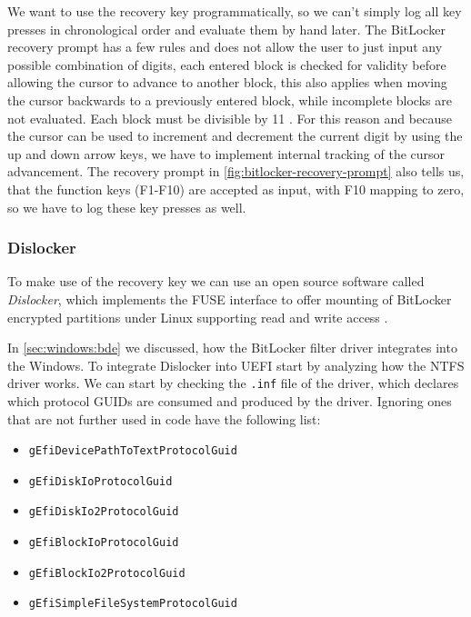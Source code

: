 

We want to use the recovery key programmatically, so we can't simply log all key presses in chronological order and evaluate them by hand later.
The BitLocker recovery prompt has a few rules and does not allow the user to just input any possible combination of digits, each entered block is checked for validity before allowing the cursor to advance to another block, this also applies when moving the cursor backwards to a previously entered block, while incomplete blocks are not evaluated.
Each block must be divisible by 11 \cite[9. BitLocker Key Recovery]{windows-internals-6-part2}.
For this reason and because the cursor can be used to increment and decrement the current digit by using the up and down arrow keys, we have to implement internal tracking of the cursor advancement.
The recovery prompt in \autoref{fig:bitlocker-recovery-prompt} also tells us, that the function keys (F1-F10) are accepted as input, with F10 mapping to zero, so we have to log these key presses as well.

\subsubsection{Dislocker}

To make use of the recovery key we can use an open source software called \emph{Dislocker}, which implements the \ac{FUSE} interface to offer mounting of BitLocker encrypted partitions under Linux supporting read and write access \cite{dislocker}.

In \autoref{sec:windows:bde} we discussed, how the BitLocker filter driver integrates into the Windows.
To integrate Dislocker into \ac{UEFI} start by analyzing how the \ac{NTFS} driver works.
We can start by checking the \lstinline{.inf} file of the driver, which declares which protocol \acp{GUID} are consumed and produced by the driver.
Ignoring ones that are not further used in code have the following list:

\begin{itemize}
    \item \lstinline{gEfiDevicePathToTextProtocolGuid}
    \item \lstinline{gEfiDiskIoProtocolGuid}
    \item \lstinline{gEfiDiskIo2ProtocolGuid}
    \item \lstinline{gEfiBlockIoProtocolGuid}
    \item \lstinline{gEfiBlockIo2ProtocolGuid}
    \item \lstinline{gEfiSimpleFileSystemProtocolGuid}
\end{itemize}

